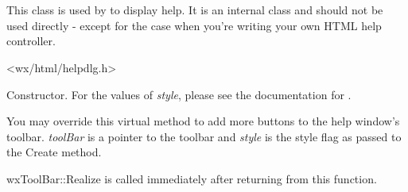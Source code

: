 %
%

\section{}\label{wxhtmlhelpdialog}

This class is used by  
to display help.
It is an internal class and should not be used directly - except for the case
when you're writing your own HTML help controller.




<wx/html/helpdlg.h>




\label{wxhtmlhelpdialogwxhtmlhelpdialog}



Constructor. For the values of {\it style}, please see the documentation for .

\label{wxhtmlhelpdialogaddtoolbarbuttons}


You may override this virtual method to add more buttons to the help window's
toolbar. {\it toolBar} is a pointer to the toolbar and {\it style} is the style
flag as passed to the Create method.

wxToolBar::Realize is called immediately after returning from this function.

\label{wxhtmlhelpdialogcreate}


